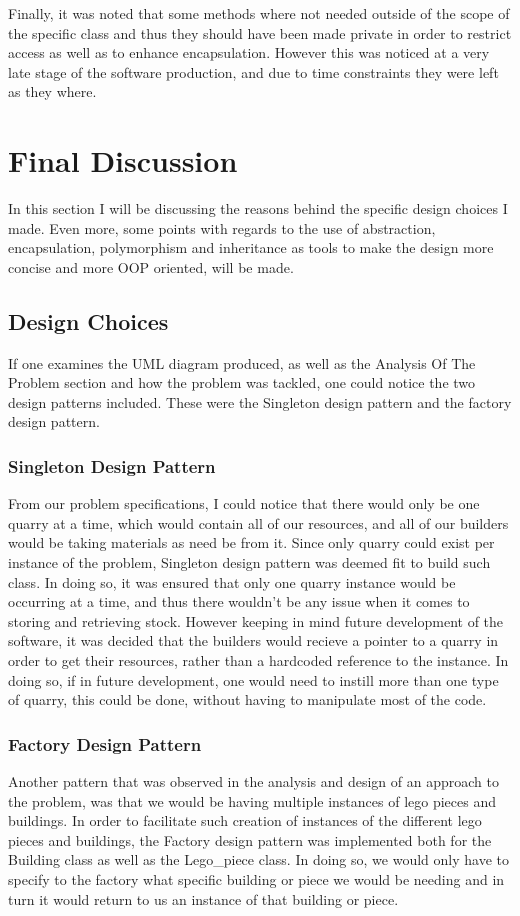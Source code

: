 \documentclass[12pt, A4]{report}
\begin{document}
	\par
	Finally, it was noted that some methods where not needed outside of the scope of the specific class and thus they should have been made private in order to restrict access as well as to enhance encapsulation. However this was noticed at a very late stage of the software production, and due to time constraints they were left as they where.


	\section*{Final Discussion}
	In this section I will be discussing the reasons behind the specific design choices I made. Even more, some points with regards to the use of abstraction, encapsulation, polymorphism and inheritance as tools to make the design more concise and more OOP oriented, will be made.

		\subsection*{Design Choices}
		If one examines the UML diagram produced, as well as the Analysis Of The Problem section and how the problem was tackled, one could notice the two design patterns included. These were the Singleton design pattern and the factory design pattern.

			\subsubsection*{Singleton Design Pattern}
			From our problem specifications, I could notice that there would only be one quarry at a time, which would contain all of our resources, and all of our builders would be taking materials as need be from it. Since only quarry could exist per instance of the problem, Singleton design pattern was deemed fit to build such class. In doing so, it was ensured that only one quarry instance would be occurring at a time, and thus there wouldn't be any issue when it comes to storing and retrieving stock. However keeping in mind future development of the software, it was decided that the builders would recieve a pointer to a quarry in order to get their resources, rather than a hardcoded reference to the instance. In doing so, if in future development, one would need to instill more than one type of quarry, this could be done, without having to manipulate most of the code.

			\subsubsection*{Factory Design Pattern}
			Another pattern that was observed in the analysis and design of an approach to the problem, was that we would be having multiple instances of lego pieces and buildings. In order to facilitate such creation of instances of the different lego pieces and buildings, the Factory design pattern was implemented both for the Building class as well as the Lego\_piece class. In doing so, we would only have to specify to the factory what specific building or piece we would be needing and in turn it would return to us an instance of that building or piece.
			
\end{document}
